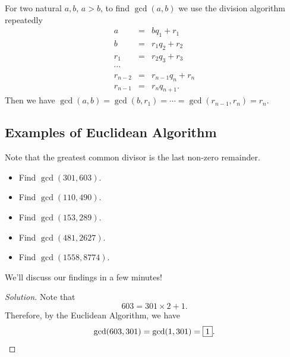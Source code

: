 \clearpage

\begin{theorem}  For two natural $a,b$, $a>b$, to find $\gcd(a,b)$ we use the division algorithm repeatedly  \begin{eqnarray*}  a&=&bq_1+r_1 \\ b&=&r_1q_2+r_2 \\ r_1&=&r_2q_3+r_3 \\ \cdots \\ r_{n-2}&=&r_{n-1}q_n+r_n \\ r_{n-1}&=&r_nq_{n+1}. \end{eqnarray*}  
	Then we have $\gcd(a, b)=\gcd(b, r_1)=\cdots=\gcd(r_{n-1}, r_n)=r_n.$  \end{theorem}
\clearpage

\subsection*{Examples of Euclidean Algorithm}

Note that the greatest common divisor is the last non-zero remainder. 
\begin{itemize}
		\item Find $\gcd(301, 603)$.  
		\item  Find $\gcd(110, 490)$.
		\item  Find $\gcd(153, 289)$.
		\item  Find $\gcd(481, 2627)$. 
\end{itemize}
\begin{itemize}[label=$\star$]
		\item Find $\gcd(1558, 8774)$. 
\end{itemize} 

We'll discuss our findings in a few minutes!

\clearpage


\begin{proof}[Solution]  
Note that $$603=301\times 2+1.$$  Therefore, by the Euclidean Algorithm, we have $$\gcd(603, 301)=\gcd(1, 301)=\framebox{1}.$$ 

\end{proof}

\clearpage


